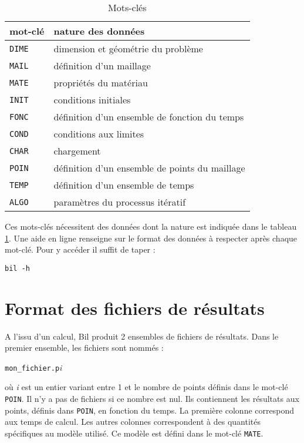\documentclass[a4paper,11pt]{article}
\begin{document}
\begin{table}[ht]
\begin{center}
\begin{tabular}{|l|l|}
\hline
mot-cl\'e & nature des donn\'ees\\ \hline \hline
{\tt DIME} & dimension et g\'eom\'etrie du probl\`eme\\ \hline
{\tt MAIL} & d\'efinition d'un maillage\\ \hline
{\tt MATE} & propri\'et\'es du mat\'eriau\\ \hline
{\tt INIT} & conditions initiales\\ \hline
{\tt FONC} & d\'efinition d'un ensemble de fonction du temps\\ \hline
{\tt COND} & conditions aux limites\\ \hline
{\tt CHAR} & chargement\\ \hline
{\tt POIN} & d\'efinition d'un ensemble de points du maillage\\ \hline
{\tt TEMP} & d\'efinition d'un ensemble de temps\\ \hline
{\tt ALGO} & param\`etres du processus it\'eratif\\ \hline
\end{tabular}
\end{center}
\caption{Mots-cl\'es}
\label{tab:t1}
\end{table}

Ces mots-cl\'es n\'ecessitent des donn\'ees dont la nature est indiqu\'ee dans le tableau \ref{tab:t1}. Une aide en ligne renseigne sur le format des donn\'ees \`a respecter apr\`es chaque mot-cl\'e. Pour y acc\'eder il suffit de taper :

{\flushleft \tt bil -h}

\section{Format des fichiers de r\'esultats}
A l'issu d'un calcul, Bil produit 2 ensembles de fichiers de r\'esultats. Dans le premier ensemble, les fichiers sont nomm\'es :
\begin{center}
{\tt mon\_fichier.p}\textit{i}
\end{center}
o\`u \textit{i} est un entier variant entre 1 et le nombre de points d\'efinis dans le mot-cl\'e {\tt POIN}. Il n'y a pas de fichiers si ce nombre est nul. Ils contiennent les r\'esultats aux points, d\'efinis dans {\tt POIN}, en fonction du temps. La premi\`ere colonne correspond aux temps de calcul. Les autres colonnes correspondent \`a des quantit\'es sp\'ecifiques au mod\`ele utilis\'e. Ce mod\`ele est d\'efini dans le mot-cl\'e {\tt MATE}.
\end{document}
